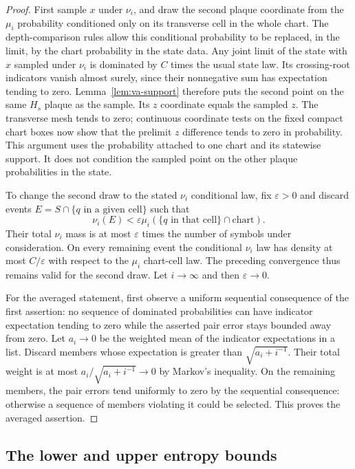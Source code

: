 \begin{proof}
First sample $x$ under $\nu_i$, and draw the second plaque coordinate from
the $\mu_i$ probability conditioned only on its transverse cell in the
whole chart.  The depth-comparison rules allow this conditional probability
to be replaced, in the limit, by the chart probability in the state data.
Any joint limit of the state with $x$ sampled under $\nu_i$ is dominated by
$C$ times the usual state law.  Its crossing-root indicators vanish almost
surely, since their nonnegative sum has expectation tending to zero.
Lemma~\ref{lem:va-support} therefore puts the second point on the same
$H_s$ plaque as the sample.  Its $z$ coordinate equals the sampled $z$.
The transverse mesh tends to zero; continuous coordinate tests on the
fixed compact chart boxes now show that the prelimit $z$ difference tends
to zero in probability.  This argument uses the probability attached to
one chart and its statewise support.  It does not condition the sampled
point on the other plaque probabilities in the state.

To change the second draw to the stated $\nu_i$ conditional law, fix
$\varepsilon>0$ and discard events $E=S\cap\{q\text{ in a given cell}\}$
such that
\[
 \nu_i(E)<\varepsilon\mu_i(\{q\text{ in that cell}\}\cap\text{chart}).
\]
Their total $\nu_i$ mass is at most $\varepsilon$ times the number of
symbols under consideration.  On every remaining event the conditional
$\nu_i$ law has density at most $C/\varepsilon$ with respect to the
$\mu_i$ chart-cell law.  The preceding convergence thus remains valid for
the second draw.  Let $i\to\infty$ and then $\varepsilon\to0$.

For the averaged statement, first observe a uniform sequential consequence
of the first assertion: no sequence of dominated probabilities can have
indicator expectation tending to zero while the asserted pair error stays
bounded away from zero.  Let $a_i\to0$ be the weighted mean of the
indicator expectations in a list.  Discard members whose expectation is
greater than $\sqrt{a_i+i^{-1}}$.  Their total weight is at most
$a_i/\sqrt{a_i+i^{-1}}\to0$ by Markov's inequality.  On the remaining
members, the pair errors tend uniformly to zero by the sequential
consequence: otherwise a sequence of members violating it could be
selected.  This proves the averaged assertion.
\end{proof}

\subsection{The lower and upper entropy bounds}

